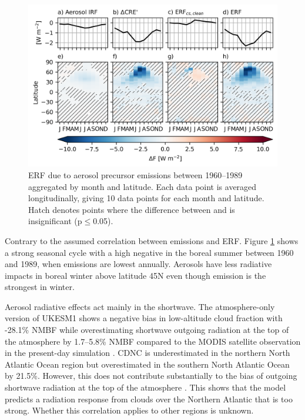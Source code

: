 \begin{figure}
    \centering
    \includegraphics{Chapter4/Figs/latitudinal_erf_sstpiaer-histsst_pothole.png}
    \caption[ERF due to aerosol precursor emissions between 1960--1989 aggregated by month and latitude]{ERF due to aerosol precursor emissions between 1960--1989 aggregated by month and latitude. Each data point is averaged longitudinally, giving 10 data points for each month and latitude. Hatch denotes points where the difference between \histsst{} and \sstpiaer{} is insignificant (p$\leq$0.05).}
    \label{fig:ch4:seasonal-erf}
\end{figure}


Contrary to the assumed correlation between emissions and ERF. Figure \ref{fig:ch4:seasonal-erf} shows a strong seasonal cycle with a high negative in the boreal summer between 1960 and 1989, when  emissions are lowest annually. Aerosols have less radiative impacts in boreal winter above latitude 45\textdegree N even though  emission is the strongest in winter. 


Aerosol radiative effects act mainly in the shortwave. The atmosphere-only version of UKESM1 shows a negative bias in low-altitude cloud fraction with -28.1\% NMBF while overestimating shortwave outgoing radiation at the top of the atmosphere by 1.7--5.8\% NMBF compared to the MODIS satellite observation in the present-day simulation \citep{grosvenorDecompositionCloudAerosol2020}. CDNC is underestimated in the northern North Atlantic Ocean region but overestimated in the southern North Atlantic Ocean by 21.5\%. However, this does not contribute substantially to the bias of outgoing shortwave radiation at the top of the atmosphere \citep{grosvenorDecompositionCloudAerosol2020}. This shows that the model predicts a radiation response from clouds over the Northern Atlantic that is too strong. Whether this correlation applies to other regions is unknown.


